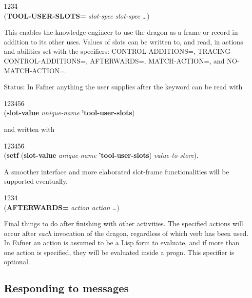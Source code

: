 \begin{tabbing}
1234\= \kill
\\
({\bf TOOL-USER-SLOTS=} {\it slot-spec slot-spec\/} \ldots) \\
\end{tabbing}
This enables the knowledge engineer to use the dragon as a frame or
record in addition to its other uses.  Values of slots can be written
to, and read, in actions and abilities set with the specifiers:
CONTROL-ADDITIONS=, TRACING-CONTROL-ADDITIONS=, AFTERWARDS=,
MATCH-ACTION=, and NO-MATCH-ACTION=.

Status: In Fafner anything the user supplies after the keyword can be
read with

\begin{tabbing}
123456\= \kill
\\
\>({\bf slot-value} {\it unique-name\/} {\bf 'tool-user-slots})
\\
\end{tabbing}

and written with

\begin{tabbing}
123456\= \kill
\\
\>({\bf setf} ({\bf slot-value} {\it unique-name\/}
{\bf 'tool-user-slots}) {\it value-to-store\/}).
\\
\end{tabbing}
A smoother interface and more elaborated slot-frame functionalities
will be supported eventually.

\begin{tabbing}
1234\= \kill
\\
({\bf AFTERWARDS=} {\it action action\/} \ldots) \\
\end{tabbing}
Final things to do after finishing with other activities.  The
specified actions will occur after {\em each\/} invocation of the
dragon, regardless of which verb has been used.  In Fafner an
action is assumed to be a Lisp form to evaluate, and if more than one
action is specified, they will be evaluated inside a progn.  This
specifier is optional.



\subsection{Responding to messages}\label{controllers}

